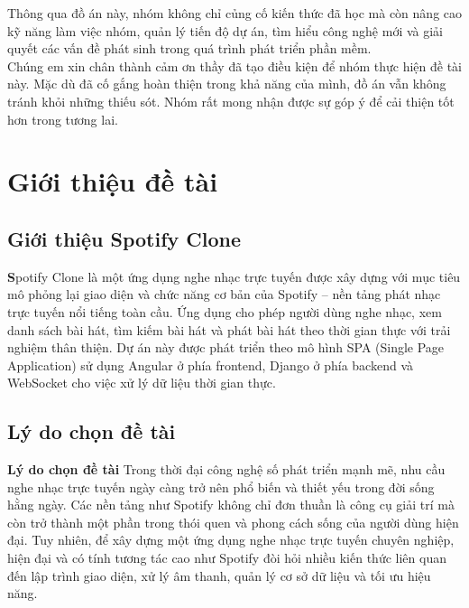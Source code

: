 \documentclass[a4paper]{article}
\begin{document}
Thông qua đồ án này, nhóm không chỉ củng cố kiến thức đã học mà còn nâng cao kỹ năng làm việc nhóm, quản lý tiến độ dự án, tìm hiểu công nghệ mới và giải quyết các vấn đề phát sinh trong quá trình phát triển phần mềm.\\

Chúng em xin chân thành cảm ơn thầy đã tạo điều kiện để nhóm thực hiện đề tài này. Mặc dù đã cố gắng hoàn thiện trong khả năng của mình, đồ án vẫn không tránh khỏi những thiếu sót. Nhóm rất mong nhận được sự góp ý để cải thiện tốt hơn trong tương lai.

\newpage




\newpage
\tableofcontents
\newpage



\section{Giới thiệu đề tài}
\subsection{Giới thiệu Spotify Clone}
		\textbf
		Spotify Clone là một ứng dụng nghe nhạc trực tuyến được xây dựng với mục tiêu mô phỏng lại giao diện và chức năng cơ bản của Spotify – nền tảng phát nhạc trực tuyến nổi tiếng toàn cầu. Ứng dụng cho phép người dùng nghe nhạc, xem danh sách bài hát, tìm kiếm bài hát và phát bài hát theo thời gian thực với trải nghiệm thân thiện. Dự án này được phát triển theo mô hình SPA (Single Page Application) sử dụng Angular ở phía frontend, Django ở phía backend và WebSocket cho việc xử lý dữ liệu thời gian thực.
	\subsection{Lý do chọn đề tài}
    
	\textbf{Lý do chọn đề tài}
	Trong thời đại công nghệ số phát triển mạnh mẽ, nhu cầu nghe nhạc trực tuyến ngày càng trở nên phổ biến và thiết yếu trong đời sống hằng ngày. Các nền tảng như Spotify không chỉ đơn thuần là công cụ giải trí mà còn trở thành một phần trong thói quen và phong cách sống của người dùng hiện đại. Tuy nhiên, để xây dựng một ứng dụng nghe nhạc trực tuyến chuyên nghiệp, hiện đại và có tính tương tác cao như Spotify đòi hỏi nhiều kiến thức liên quan đến lập trình giao diện, xử lý âm thanh, quản lý cơ sở dữ liệu và tối ưu hiệu năng.
\end{document}
